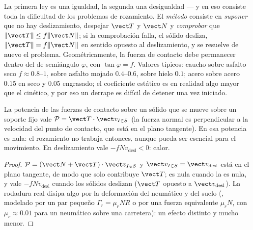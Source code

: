 \begin{remark}\label{rem:b2:rigid-body-mechanics:reading}
La primera ley es una igualdad, la segunda una desigualdad --- y en eso
consiste toda la dificultad de los problemas de rozamiento. El
\emph{método} consiste en \emph{suponer} que no hay deslizamiento, despejar
$\vect T$ y $\vect N$ y \emph{comprobar} que $\|\vect T\| \le f\|\vect N\|$;
si la comprobación falla, el sólido desliza, $\|\vect T\| = f\|\vect N\|$ en
sentido opuesto al deslizamiento, y se resuelve de nuevo el problema.
Geométricamente, la fuerza de contacto debe permanecer dentro del
\emph{} de semiángulo $\varphi$, con $\tan\varphi
= f$. Valores típicos: caucho sobre asfalto seco $f \approx 0.8$--$1$, sobre
asfalto mojado $0.4$--$0.6$, sobre hielo $0.1$; acero sobre acero $0.15$ en
seco y $0.05$ engrasado; el coeficiente estático es en realidad algo mayor
que el cinético, y por eso un derrape es difícil de detener una vez iniciado.
\end{remark}

\begin{proposition}\label{prop:b2:rigid-body-mechanics:power}
La potencia de las fuerzas de contacto sobre un sólido que se mueve sobre
un soporte fijo vale $\mathcal P = \vect T\cdot\vect v_{I\in S}$ (la fuerza
normal es perpendicular a la velocidad del punto de contacto, que está en
el plano tangente). En \emph{} esa potencia es
nula: el rozamiento no trabaja entonces, aunque pueda ser esencial para el
movimiento. En deslizamiento vale $-f N v_{\text{desl}} < 0$: calor.
\end{proposition}

\begin{proof}
$\mathcal P = (\vect N + \vect T)\cdot\vect v_{I\in S}$ y $\vect
v_{I\in S} = \vect v_{\text{desl}}$ está en el plano tangente, de modo que
solo contribuye $\vect T$; es nula cuando la  es
nula, y vale $-fNv_{\text{desl}}$ cuando los sólidos deslizan ($\vect T$
opuesto a $\vect
v_{\text{desl}}$). La rodadura real disipa algo por la deformación del
neumático y del suelo (\emph{}, modelado por un par
pequeño $\Gamma_r = \mu_rNR$ o por una fuerza equivalente $\mu_rN$, con
$\mu_r \approx 0.01$ para un neumático sobre una carretera): un efecto
distinto y mucho menor.
\end{proof}

